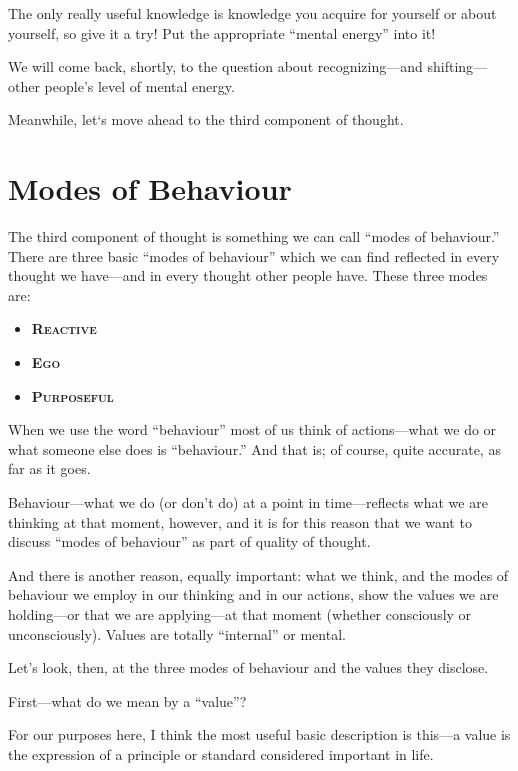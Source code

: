 \documentclass[a5paper]{article}
\begin{document}
The only really useful knowledge is knowledge you acquire for yourself or about yourself, so give it a try!
Put the appropriate ``mental energy'' into it!

We will come back, shortly, to the question about recognizing---and shifting---other people's level of mental energy.

Meanwhile, let‘s move ahead to the third component of thought.

\section{Modes of Behaviour}
The third component of thought is something we can call ``modes of behaviour.''
There are three basic ``modes of behaviour'' which we can find reflected in every thought we have---and in every thought other people have.
These three modes are:
\begin{itemize}
  \item \textbf{\scshape Reactive}
  \item \textbf{\scshape Ego}
  \item \textbf{\scshape Purposeful}
\end{itemize}
When we use the word ``behaviour'' most of us think of actions---what we do or what someone else does is ``behaviour.''
And that is; of course, quite accurate, as far as it goes.

Behaviour---what we do (or don't do) at a point in time---reflects what we are thinking at that moment, however, and it is for this reason that we want to discuss ``modes of behaviour'' as part of quality of thought.

And there is another reason, equally important: what we think, and the modes of behaviour we employ in our thinking and in our actions, show the values we are holding---or that we are applying---at that moment (whether consciously or unconsciously).
Values are totally ``internal'' or mental.

Let's look, then, at the three modes of behaviour and the values they disclose.

First---what do we mean by a ``value''?

For our purposes here, I think the most useful basic description is this---a value is the expression of a principle or standard considered important in life.
\end{document}
